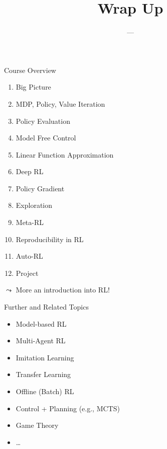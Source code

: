 \documentclass[aspectratio=169]{../latex_main/tntbeamer}  %
\title[Meta-RL]{Wrap Up}
\subtitle{---}
\begin{document}
	
	\maketitle

\begin{frame}[c]{Course Overview}
	
	\begin{enumerate}
		\item Big Picture
		\item MDP, Policy, Value Iteration
		\item Policy Evaluation
		\item Model Free Control
		\item Linear Function Approximation
		\item Deep RL
		\item Policy Gradient
		\item Exploration
		\item Meta-RL
		\item Reproducibility in RL
		\item Auto-RL
		\item Project
	\end{enumerate}
	
	\pause
	$\leadsto$ More an introduction into RL!
	
\end{frame}
\begin{frame}[c]{Further and Related Topics}
	
	\begin{itemize}
	    \item Model-based RL
	    \item Multi-Agent RL
	    \item Imitation Learning
	    \item Transfer Learning
	    \item Offline (Batch) RL
	    \item Control + Planning (e.g., MCTS)
	    \item Game Theory
	    \item \ldots
	\end{itemize}
\end{frame}
\end{document}
